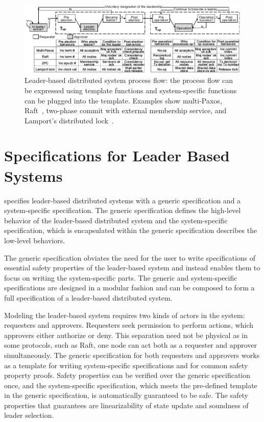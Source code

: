 

\begin{figure}
\includegraphics{figs/witnesspassing/overviewfig}
\vspace{-1em}
\caption{Leader-based distributed system process flow: the process flow can be
	expressed using template functions and system-specific functions can
	be plugged into the template. Examples show multi-Paxos, 
	Raft~\cite{raft}, two-phase commit with external membership service, 
	and Lamport's distributed lock~\cite{lamportclock}.}
\label{fig:process-flow}
\vspace{-1em}
\end{figure}

\section{Specifications for Leader Based Systems}
\label{sec:specs-for-leader-based-system}

\sysname{} specifies leader-based distributed systems with a generic
specification and a system-specific specification. 
The generic specification defines the high-level behavior of the leader-based 
distributed system and the system-specific specification, which is encapsulated 
within the generic specification describes the low-level behaviors. 

The generic specification obviates the need for the user to write specifications
of essential safety properties of the leader-based system and instead enables them to
focus on writing the system-specific parts. The
generic and system-specific specifications are designed in a modular fashion and
can be composed to form a full specification of a leader-based distributed system.

Modeling the leader-based system requires two kinds of actors in the system:
requesters and approvers. 
Requesters seek permission to perform actions, which approvers either authorize or deny.
This separation need not be physical as in some protocols, such as Raft, one node can act
both as a requester and approver simultaneously.
The generic specification for both requesters and approvers 
works as a template for writing system-specific
specifications and for common safety property proofs.
Safety properties can be verified over the generic specification once,
and the system-specific specification, which meets the pre-defined template in
the generic specification, is automatically guaranteed to be safe. The safety
properties that \sysname{} guarantees are linearizability of state update and
soundness of leader selection.

